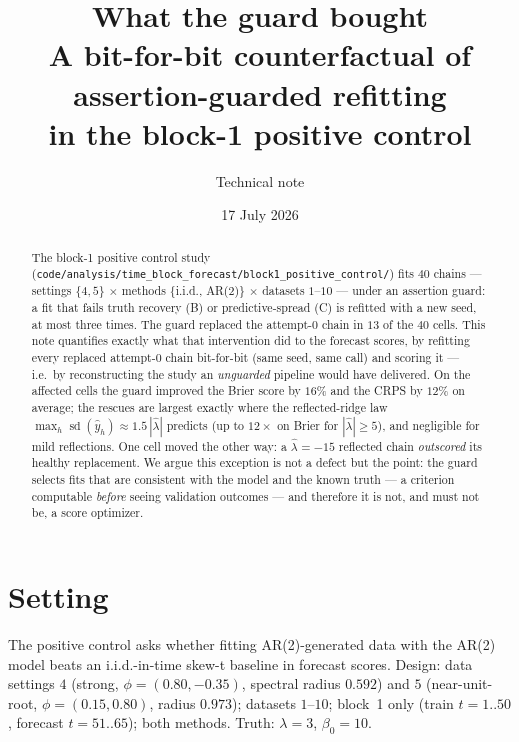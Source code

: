 \documentclass[11pt]{article}
\title{\textbf{What the guard bought}\\[2pt]
\large A bit-for-bit counterfactual of assertion-guarded refitting\\
in the block-1 positive control}
\author{Technical note}
\date{17 July 2026}
\newcommand{\code}[1]{\texttt{#1}}
\DeclareMathOperator{\sd}{sd}
\begin{document}
\maketitle

\begin{abstract}
The block-1 positive control study
(\code{code/analysis/time\_block\_forecast/block1\_positive\_control/}) fits
$40$ chains --- settings $\{4,5\}$ $\times$ methods \{i.i.d., AR(2)\} $\times$
datasets $1$--$10$ --- under an assertion guard: a fit that fails truth
recovery (B) or predictive-spread (C) is refitted with a new seed, at most
three times. The guard replaced the attempt-0 chain in $13$ of the $40$ cells.
This note quantifies exactly what that intervention did to the forecast
scores, by refitting every replaced attempt-0 chain bit-for-bit (same seed,
same call) and scoring it --- i.e.\ by reconstructing the study an
\emph{unguarded} pipeline would have delivered. On the affected cells the
guard improved the Brier score by $16\%$ and the CRPS by $12\%$ on average;
the rescues are largest exactly where the reflected-ridge law
$\max_h \sd(\hat y_h) \approx 1.5\,|\hat\lambda|$ predicts
(up to $12\times$ on Brier for $|\hat\lambda| \ge 5$), and negligible for
mild reflections. One cell moved the other way: a $\hat\lambda = -15$
reflected chain \emph{outscored} its healthy replacement. We argue this
exception is not a defect but the point: the guard selects fits that are
consistent with the model and the known truth --- a criterion computable
\emph{before} seeing validation outcomes --- and therefore it is not, and
must not be, a score optimizer.
\end{abstract}

\section{Setting}

The positive control asks whether fitting AR(2)-generated data with the
AR(2) model beats an i.i.d.-in-time skew-t baseline in forecast scores.
Design: data settings $4$ (strong, $\phi = (0.80, -0.35)$, spectral radius
$0.592$) and $5$ (near-unit-root, $\phi = (0.15, 0.80)$, radius $0.973$);
datasets $1$--$10$; block~1 only (train $t = 1..50$, forecast $t = 51..65$);
both methods. Truth: $\lambda = 3$, $\beta_0 = 10$.
\end{document}
